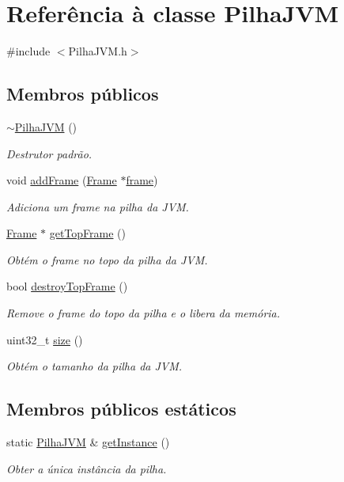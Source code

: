\hypertarget{classPilhaJVM}{}\section{Referência à classe Pilha\+J\+VM}
\label{classPilhaJVM}


{\ttfamily \#include $<$Pilha\+J\+V\+M.\+h$>$}

\subsection*{Membros públicos}
\begin{DoxyCompactItemize}
\item 
\hyperlink{classPilhaJVM_a7995ffc4e2ca9b149b83293cbbe0ea1b}{$\sim$\+Pilha\+J\+VM} ()
\begin{DoxyCompactList}\small\item\em Destrutor padrão. \end{DoxyCompactList}\item 
void \hyperlink{classPilhaJVM_a64d7185bc812d3c81e5270c54c212e07}{add\+Frame} (\hyperlink{classFrame}{Frame} $\ast$\hyperlink{classframe}{frame})
\begin{DoxyCompactList}\small\item\em Adiciona um frame na pilha da J\+VM. \end{DoxyCompactList}\item 
\hyperlink{classFrame}{Frame} $\ast$ \hyperlink{classPilhaJVM_aa0e43da476df6147c86c8cc3d6899718}{get\+Top\+Frame} ()
\begin{DoxyCompactList}\small\item\em Obtém o frame no topo da pilha da J\+VM. \end{DoxyCompactList}\item 
bool \hyperlink{classPilhaJVM_a8ae0ed77b894fa95e73ea4077ebdeea2}{destroy\+Top\+Frame} ()
\begin{DoxyCompactList}\small\item\em Remove o frame do topo da pilha e o libera da memória. \end{DoxyCompactList}\item 
uint32\+\_\+t \hyperlink{classPilhaJVM_a22d7bcd7db598b00ae219c9c2efb2c88}{size} ()
\begin{DoxyCompactList}\small\item\em Obtém o tamanho da pilha da J\+VM. \end{DoxyCompactList}\end{DoxyCompactItemize}
\subsection*{Membros públicos estáticos}
\begin{DoxyCompactItemize}
\item 
static \hyperlink{classPilhaJVM}{Pilha\+J\+VM} \& \hyperlink{classPilhaJVM_a13bf1c43de7819ea7761616f7a04c3b9}{get\+Instance} ()
\begin{DoxyCompactList}\small\item\em Obter a única instância da pilha. \end{DoxyCompactList}\end{DoxyCompactItemize}
